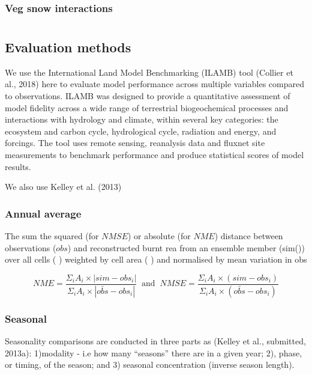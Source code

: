 \documentclass[bg, manuscript]{copernicus}
\begin{document}
\subsubsection{Veg snow interactions}

\section{}

\subsection{Evaluation methods}

We use the International Land Model Benchmarking (ILAMB) tool (Collier et al., 2018) here to evaluate model performance across multiple variables compared to observations. ILAMB was designed to provide a quantitative assessment of model fidelity across a wide range of terrestrial biogeochemical processes and interactions with hydrology and climate, within several key categories: the ecosystem and carbon cycle, hydrological cycle, radiation and energy, and forcings. The tool uses remote sensing, reanalysis data and fluxnet site measurements to benchmark performance and produce statistical scores of model results. 

We also use Kelley et al. (2013)

\subsubsection{Annual average}
The sum the squared (for $NMSE$) or absolute (for $NME$) distance between observations ($obs$) and reconstructed burnt  rea from an ensemble member (sim()) over all cells  ( ) weighted by cell area ( ) and normalised by mean variation in obs

\begin{equation}
    NME = \frac{\Sigma_i A_i \times  |sim - obs_i |}{\Sigma_i A_i \times |\bar{obs} - obs_i |} \  \text{   and   } \
    NMSE = \frac{\Sigma_i A_i \times  (sim- obs_i) }{\Sigma_i A_i \times (\bar{obs} - obs_i )}
\end{equation}

\subsubsection{Seasonal}
Seasonality comparisons are conducted in three parts as  (Kelley et al., submitted, 2013a): 1)modality - i.e how many “seasons” there are in a given year; 2), phase, or timing, of the season; and 3) seasonal concentration (inverse season length).
\end{document}
